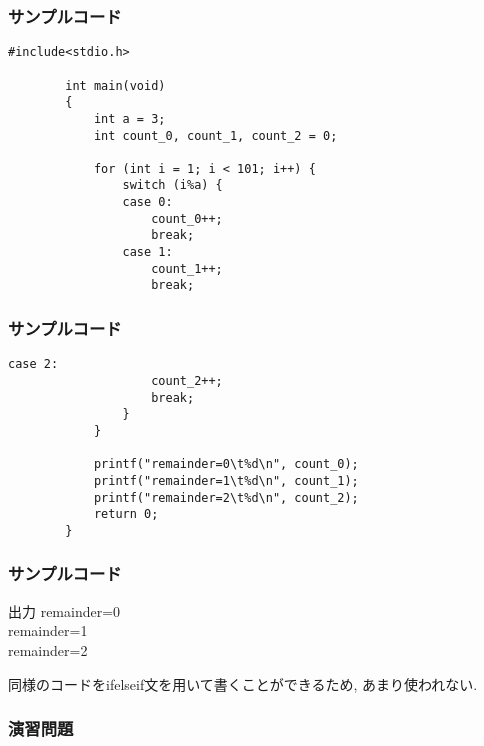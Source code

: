 \documentclass[dvipdfmx]{beamer}
\begin{document}
\begin{frame}[t, fragile, label=39]
    \frametitle{サンプルコード}
    \begin{lstlisting}[gobble=8, caption=pra\_switch.c, label=pra-switch1]
        #include<stdio.h>

        int main(void)
        {
            int a = 3;
            int count_0, count_1, count_2 = 0;
            
            for (int i = 1; i < 101; i++) {
                switch (i%a) {
                case 0:
                    count_0++;
                    break;  
                case 1:
                    count_1++;
                    break;
    \end{lstlisting}
    \vfill \hfill 
    \hyperlink{38}{}
    \space
    \hyperlink{40}{}
\end{frame}

\begin{frame}[t, fragile, label=40]
    \frametitle{サンプルコード}
    \begin{lstlisting}[firstnumber=16, gobble=8, caption=pra\_switch.c, label=pra-switch2]
                case 2:
                    count_2++;
                    break;
                }
            }

            printf("remainder=0\t%d\n", count_0);
            printf("remainder=1\t%d\n", count_1);
            printf("remainder=2\t%d\n", count_2);
            return 0;
        }
    \end{lstlisting}
    \vfill \hfill 
    \hyperlink{39}{}
    \space
    \hyperlink{41}{}
\end{frame}

\begin{frame}[label=41]
    \frametitle{サンプルコード}
    \begin{block}{出力} 
        remainder=0\\
        remainder=1\\
        remainder=2
    \end{block}
    同様のコードをif\space else\space if文を用いて書くことができるため,
    あまり使われない.
    \vfill \hfill 
    \hyperlink{40}{}
    \space
    \hyperlink{42}{}
\end{frame}

\begin{frame}[t, fragile, label=42]
    \frametitle{演習問題}
    \vfill \hfill 
    \hyperlink{41}{}
    \space
    \hyperlink{43}{}
\end{frame}
\end{document}

